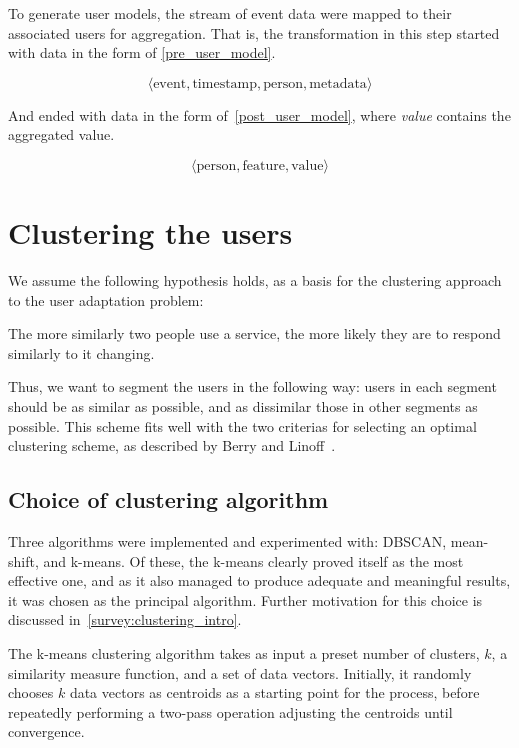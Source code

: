 To generate user models, the stream of event data were mapped to their associated users for aggregation. That is, the transformation in this step started with data in the form of \eqref{pre_user_model}.

\begin{equation}
  \langle \text{event}, \text{timestamp}, \text{person}, \text{metadata} \rangle
  \label{pre_user_model}
\end{equation}

And ended with data in the form of~\eqref{post_user_model}, where \emph{value} contains the aggregated value.

\begin{equation}
  \langle \text{person}, \text{feature}, \text{value} \rangle
  \label{post_user_model}
\end{equation}

\section{Clustering the users}
\label{approach:clustering}

We assume the following hypothesis holds, as a basis for the clustering approach to the user adaptation problem:

\begin{hypothesis}
The more similarly two people use a service, the more likely they are to respond similarly to it changing.
\end{hypothesis}

Thus, we want to segment the users in the following way: users in each segment should be as similar as possible, and as dissimilar those in other segments as possible. This scheme fits well with the two criterias for selecting an optimal clustering scheme, as described by Berry and Linoff~\cite{Berry1997}.

\subsection{Choice of clustering algorithm}
\label{approach:clustering_algorithm}

Three algorithms were implemented and experimented with: DBSCAN, mean-shift, and k-means. Of these, the k-means clearly proved itself as the most effective one, and as it also managed to produce adequate and meaningful results, it was chosen as the principal algorithm. Further motivation for this choice is discussed in~\ref{survey:clustering_intro}.

The k-means clustering algorithm takes as input a preset number of clusters, $k$, a similarity measure function, and a set of data vectors. Initially, it randomly chooses $k$ data vectors as centroids as a starting point for the process, before repeatedly performing a two-pass operation adjusting the centroids until convergence.

